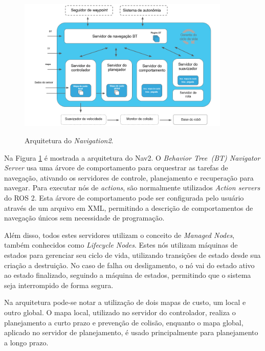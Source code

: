 \documentclass[repeatfields,xlists,xpacks,oneside,yearsonly]{ufrgscca}
\begin{document}
\begin{figure}[h]
    {
        \centering
        \caption{Arquitetura do \textit{Navigation2}.}
        \label{fig:nav2_arc}
        \includegraphics[width=0.9\textwidth]{nav2_architecture_trad.png}\\
    }
    {} %
\end{figure}

Na Figura \ref{fig:nav2_arc} é mostrada a arquitetura do Nav2.
O \textit{Behavior Tree~(BT) Navigator Server} usa uma árvore de comportamento para
orquestrar as tarefas de navegação, ativando os servidores de controle, planejamento e
recuperação para navegar.
Para executar nós de \textit{actions}, são normalmente utilizados
\textit{Action servers} do ROS 2.
Esta árvore de comportamento pode ser configurada pelo usuário através de um arquivo
em XML, permitindo a descrição de comportamentos de navegação únicos sem
necessidade de programação.

Além disso, todos estes servidores utilizam o conceito de \textit{Managed Nodes},
também conhecidos como \textit{Lifecycle Nodes}.
Estes nós utilizam máquinas de estados para gerenciar seu ciclo de vida, utilizando
transições de estado desde sua criação a destruição.
No caso de falha ou desligamento, o nó vai do estado ativo ao estado finalizado,
seguindo a máquina de estados, permitindo que o sistema seja interrompido
de forma segura.

Na arquitetura pode-se notar a utilização de dois mapas de custo, um local e
outro global.
O mapa local, utilizado no servidor do controlador, realiza o planejamento
a curto prazo e prevenção de colisão, enquanto o mapa global,
aplicado no servidor de planejamento, é usado principalmente
para planejamento a longo prazo.
\end{document}
